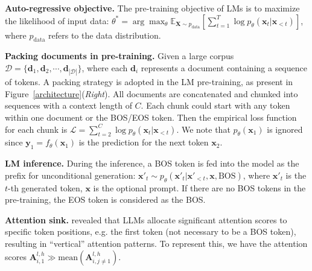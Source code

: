 \documentclass{article} \usepackage{iclr2025_conference,times}
\begin{document}
\textbf{Auto-regressive objective.}  The pre-training objective of LMs is to maximize the likelihood of input data: $\theta^*=\arg\max_{\theta} \mathbb{E}_{\boldsymbol{X}\sim p_{\textrm{data}}}\left[\sum_{t=1}^T\log p_{\theta}(\boldsymbol{x}_t|\boldsymbol{x}_{<t})\right]$, where $p_{\textrm{data}}$ refers to the data distribution. 











\textbf{Packing documents in pre-training.} Given a large corpus $\mathcal{D}=\{\boldsymbol{d}_1\textrm{,}\,\boldsymbol{d}_2\textrm{,}\,\cdots\textrm{,}\,\boldsymbol{d}_{|\mathcal{D}|}\}$, where each $\boldsymbol{d}_i$ represents a document containing a sequence of tokens. A packing strategy is adopted in the LM pre-training, as present in Figure~\ref{architecture}(\emph{Right}). All documents are concatenated and chunked into sequences with a context length of $C$. Each chunk could start with any token within one document or the BOS/EOS token. Then the empirical loss function for each chunk is $\mathcal{L}=\sum_{t=2}^C\log p_{\theta}(\boldsymbol{x}_t|\boldsymbol{x}_{<t})$. We note that $p_{\theta}(\boldsymbol{x}_1)$ is ignored since $\boldsymbol{y}_1=f_{\theta}(\boldsymbol{x}_1)$ is the prediction for the next token $\boldsymbol{x}_2$.





\textbf{LM inference.} During the inference, a BOS token is fed into the model as the prefix for unconditional generation: $\boldsymbol{x}'_t\sim p_{\theta}(\boldsymbol{x}'_t|\boldsymbol{x}'_{<t}\textrm{,}\,\boldsymbol{x}\textrm{,}\,\textrm{BOS})$, where $\boldsymbol{x}'_t$ is the $t$-th generated token, $\boldsymbol{x}$ is the optional prompt. If there are no BOS tokens in the pre-training, the EOS token is considered as the BOS.











\textbf{Attention sink.} \citet{xiao2023efficient} revealed that LLMs allocate significant attention scores to specific token positions, e.g. the first token (not necessary to be a BOS token), resulting in ``vertical'' attention patterns. To represent this, we have the attention scores $\boldsymbol{A}_{i\textrm{,}\,1}^{l\textrm{,}\,h}\gg \textrm{mean}(\boldsymbol{A}_{i\textrm{,}\,j\neq 1}^{l\textrm{,}\,h})$.
\end{document}
